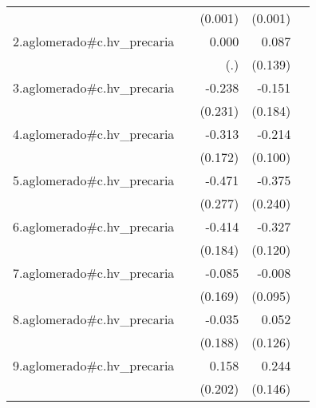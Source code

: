 {\begin{longtable}{l*{4}{D{.}{.}{-1}}}
            &                     &     (0.001)         &     (0.001)         &                     \\
\addlinespace
2.aglomerado#c.hv\_precaria&                     &       0.000         &       0.087         &                     \\
            &                     &         (.)         &     (0.139)         &                     \\
\addlinespace
3.aglomerado#c.hv\_precaria&                     &      -0.238         &      -0.151         &                     \\
            &                     &     (0.231)         &     (0.184)         &                     \\
\addlinespace
4.aglomerado#c.hv\_precaria&                     &      -0.313         &      -0.214\sym{*}  &                     \\
            &                     &     (0.172)         &     (0.100)         &                     \\
\addlinespace
5.aglomerado#c.hv\_precaria&                     &      -0.471         &      -0.375         &                     \\
            &                     &     (0.277)         &     (0.240)         &                     \\
\addlinespace
6.aglomerado#c.hv\_precaria&                     &      -0.414\sym{*}  &      -0.327\sym{**} &                     \\
            &                     &     (0.184)         &     (0.120)         &                     \\
\addlinespace
7.aglomerado#c.hv\_precaria&                     &      -0.085         &      -0.008         &                     \\
            &                     &     (0.169)         &     (0.095)         &                     \\
\addlinespace
8.aglomerado#c.hv\_precaria&                     &      -0.035         &       0.052         &                     \\
            &                     &     (0.188)         &     (0.126)         &                     \\
\addlinespace
9.aglomerado#c.hv\_precaria&                     &       0.158         &       0.244         &                     \\
            &                     &     (0.202)         &     (0.146)         &                     \\

\end{longtable}}
